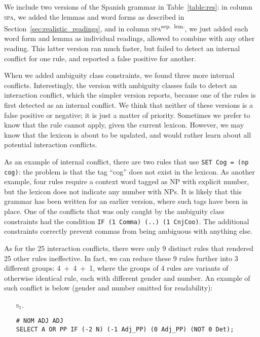 {{We include two versions of the Spanish grammar in Table~\ref{table:res}: in column \textsc{spa}, we added the lemmas and word forms as described in Section~\ref{sec:realistic_readings}, and in column \textsc{spa}\textsuperscript{sep.~lem.}, we just added each word form and lemma as individual readings, allowed to combine with any other reading. 
This latter version ran much faster, but failed to detect an internal conflict for one rule, and reported a false positive for another. 

When we added ambiguity class constraints, we found three more internal conflicts.
Interestingly, the version with ambiguity classes fails to detect an interaction conflict, which the simpler version reports, because one of the rules is first detected as an internal conflict. 
We think that neither of these versions is a false positive or negative; it is just a matter of priority. Sometimes we prefer to know that the rule cannot apply, given the current lexicon. 
However, we may know that the lexicon is about to be updated, and would rather learn about all potential interaction conflicts.

As an example of internal conflict, there are two rules that use \texttt{SET Cog = (np cog)}: the problem is that the tag ``cog'' does not exist in the lexicon. As another example, four rules require a context word tagged as NP with explicit number, but the lexicon does not indicate any number with NPs. It is likely that this grammar has been written for an earlier version, where such tags have been in place.
One of the conflicts that was only caught by the ambiguity class constraints had the condition \texttt{IF (1 Comma) (..) (1 CnjCoo)}. The additional constraints correctly prevent commas from being ambiguous with anything else.

As for the 25 interaction conflicts, there were only 9 distinct rules that rendered 25 other rules ineffective.
In fact, we can reduce these 9 rules further into 3 different groups: 4~+~4~+~1, where the groups of 4 rules are variants of otherwise identical rule, each with different gender and number.
An example of such conflict is below (gender and number omitted for readability):

\begin{itemize}
\item[\textsc{s$_{1}$.}] 
\begin{verbatim}
# NOM ADJ ADJ
SELECT A OR PP IF (-2 N) (-1 Adj_PP) (0 Adj_PP) (NOT 0 Det);


\end{verbatim}
\end{itemize}}}
